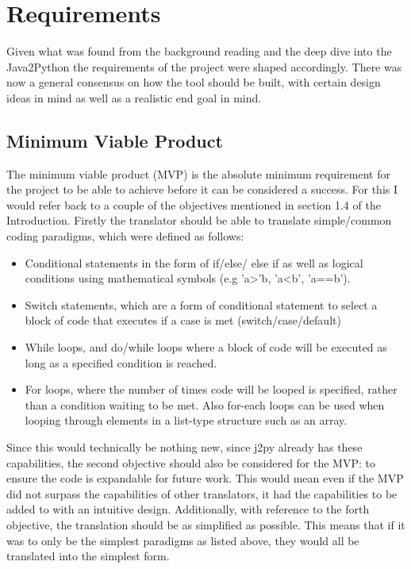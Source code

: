 \documentclass{l4proj}
\begin{document}
\section{Requirements}
Given what was found from the background reading and the deep dive into the Java2Python the requirements of the project were shaped accordingly. There was now a general consensus on how the tool should be built, with certain design ideas in mind as well as a realistic end goal in mind.

\subsection{Minimum Viable Product}
The minimum viable product (MVP) is the absolute minimum requirement for the project to be able to achieve before it can be considered a success. For this I would refer back to a couple of the objectives mentioned in section 1.4 of the Introduction. Firstly the translator should be able to translate simple/common coding paradigms, which were defined as follows:
\begin{itemize}
    \item
    Conditional statements in the form of if/else/ else if as well as logical conditions using mathematical symbols (e.g 'a>'b, 'a<b', 'a==b').
    \item
    Switch statements, which are a form of conditional statement to select a block of code that executes if a case is met (switch/case/default)
    \item
    While loops, and do/while loops where a block of code will be executed as long as a specified condition is reached.
    \item
    For loops, where the number of times code will be looped is specified, rather than a condition waiting to be met. Also for-each loops can be used when looping through elements in a list-type structure such as an array.
\end{itemize}

Since this would technically be nothing new, since j2py already has these capabilities, the second objective should also be considered for the MVP: to ensure the code is expandable for future work. This would mean even if the MVP did not surpass the capabilities of other translators, it had the capabilities to be added to with an intuitive design. Additionally, with reference to the forth objective, the translation should be as simplified as possible. This means that if it was to only be the simplest paradigms as listed above, they would all be translated into the simplest form.
\end{document}
